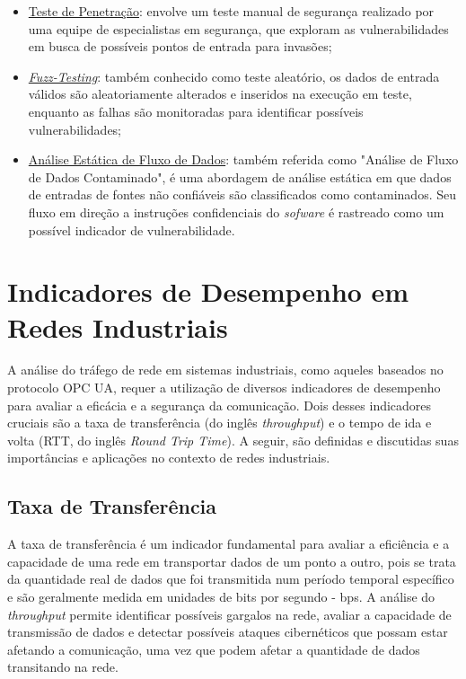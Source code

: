     \begin{itemize}
        \item \underline{Teste de Penetração}: envolve um teste manual de segurança realizado por uma equipe de especialistas em segurança, que exploram as vulnerabilidades em busca de possíveis pontos de entrada para invasões;
        \item \underline{\textit{Fuzz-Testing}}: também conhecido como teste aleatório, os dados de entrada válidos são aleatoriamente alterados e inseridos na execução em teste, enquanto as falhas são monitoradas para identificar possíveis vulnerabilidades;
        \item \underline{Análise Estática de Fluxo de Dados}: também referida como "Análise de Fluxo de Dados Contaminado", é uma abordagem de análise estática em que dados de entradas de fontes não confiáveis são classificados como contaminados. Seu fluxo em direção a instruções confidenciais do \textit{sofware} é rastreado como um possível indicador de vulnerabilidade.
    \end{itemize}

    \section{Indicadores de Desempenho em Redes Industriais}

    A análise do tráfego de rede em sistemas industriais, como aqueles baseados no protocolo OPC UA, requer a utilização de diversos indicadores de desempenho para avaliar a eficácia e a segurança da comunicação. Dois desses indicadores cruciais são a taxa de transferência (do inglês \textit{throughput}) e o tempo de ida e volta (RTT, do inglês \textit{Round Trip Time}). A seguir, são definidas e discutidas suas importâncias e aplicações no contexto de redes industriais.

    \subsection{Taxa de Transferência}

    A taxa de transferência é um indicador fundamental para avaliar a eficiência e a capacidade de uma rede em transportar dados de um ponto a outro, pois se trata da quantidade real de dados que foi transmitida num período temporal específico e são geralmente medida em unidades de bits por segundo - bps. A análise do \textit{throughput} permite identificar possíveis gargalos na rede, avaliar a capacidade de transmissão de dados e detectar possíveis ataques cibernéticos que possam estar afetando a comunicação, uma vez que podem afetar a quantidade de dados transitando na rede.

